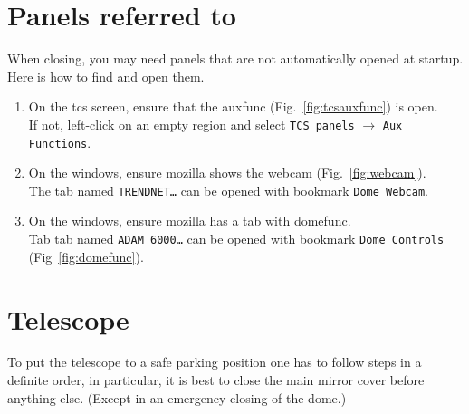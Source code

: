 \documentclass[11pt,fleqn]{book} %
\begin{document}
\section{Panels referred to}
When closing, you may need panels that are not automatically opened at startup. Here is how to find and open them.
\begin{enumerate}
\item On the \gls{tcs} screen, ensure that the \gls{auxfunc} (Fig.~\ref{fig:tcsauxfunc}) is open.\\
      If not, left-click on an empty region and select \texttt{TCS panels} $\rightarrow$ \texttt{Aux Functions}.
\item On the \gls{windows}, ensure mozilla shows the \gls{webcam} (Fig.~\ref{fig:webcam}).\\
      The tab named \texttt{TRENDNET…} can be opened with bookmark \texttt{Dome Webcam}.
\item On the \gls{windows}, ensure mozilla has a tab with \gls{domefunc}.\\
      Tab tab named \texttt{ADAM 6000…} can be opened with bookmark \texttt{Dome Controls} (Fig~\ref{fig:domefunc}).
\end{enumerate}

\section{Telescope}

To put the telescope to a safe parking position one has to follow steps in a definite order, in particular, it is best to close the main mirror cover before anything else.
(Except in an emergency closing of the dome.) 
\end{document}
